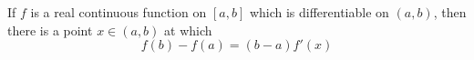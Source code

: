 \documentclass[11pt]{article}
\numberwithin{equation}{section}
\newcommand{\navy}[1]{\textcolor{MidnightBlue}{\bf #1}}
\theoremstyle{definition}
\theoremstyle{definition}
\newcommand\norm[1]{\lVert#1\rVert}
\newcommand{\1}{\mathbbm 1}
\def\d{\delta}
\newcommand{\p}{\varphi}
\newcommand{\e}{\varepsilon}
\begin{document}
\begin{theorem}
	If $f$ is a real continuous function on $[a,b]$ which is differentiable on $(a,b)$, then there is a point $x \in (a,b)$ at which 
	\begin{equation}
		f(b) - f(a) = (b - a) f'(x)
	\end{equation}
\end{theorem}







\end{document}
